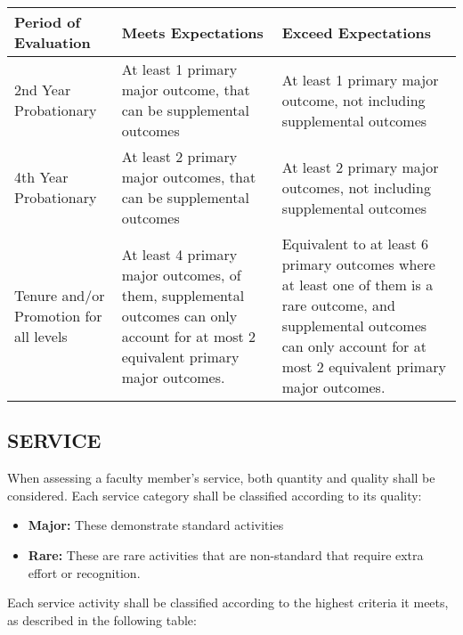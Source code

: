 \documentclass{scrartcl}
\begin{document}
\begin{longtable}{p{4cm}p{5cm}P{5cm}}

\hline
\textbf{Period of Evaluation} & \textbf{Meets Expectations} & \textbf{Exceed Expectations}\\
\hline
\endhead %
2nd Year Probationary & At least 1 primary major outcome, that can be supplemental outcomes & At least 1 primary major outcome, not including supplemental outcomes \\ \hline
4th Year Probationary & At least 2 primary major outcomes, that can be supplemental outcomes & At least 2 primary major outcomes, not including supplemental outcomes \\ \hline
Tenure and/or Promotion for all levels & At least 4 primary major outcomes, of them, supplemental outcomes can only account for at most 2 equivalent primary major outcomes. & Equivalent to at least 6 primary outcomes where at least one of them is a rare outcome, and supplemental outcomes can only account for at most 2 equivalent primary major outcomes. \\ \hline

\end{longtable}

\subsection{SERVICE}

When assessing a faculty member’s service, both quantity and quality shall be considered. Each service category shall be classified according to its quality:
\begin{itemize}
\item \textbf{Major:} These demonstrate standard activities
\item \textbf{Rare:} These are rare activities that are non-standard that require extra effort or recognition.
\end{itemize}
Each service activity shall be classified according to the highest criteria it meets, as described in the following table:
\end{document}
